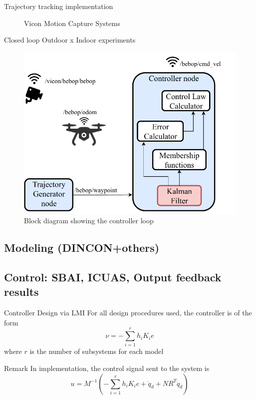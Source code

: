 \begin{frame}{Trajectory tracking implementation}
\begin{figure}
\begin{minipage}{0.45\textwidth}
        \caption{Vicon Motion Capture Systems}
    \end{minipage}
    \end{figure}
\end{frame}

\begin{frame}{Closed loop}
Outdoor x Indoor experiments
    \begin{figure}[!htb]
	\centering
	\includegraphics[scale=0.5]{figuras/control_scheme-Page-4.pdf}
	\caption{Block diagram showing the controller loop}
	\label{fig:control_scheme}
\end{figure}
\end{frame}



\subsection{Modeling (DINCON+others)}


\subsection{Control: SBAI, ICUAS, Output feedback results}
\begin{frame}{Controller Design via LMI}
	For all design procedures used, the controller is of the form
	\begin{equation}\label{FC}
	\nu=-\sum_{i=1}^{r}h_iK_ie
	\end{equation}
	where $r$ is the number of subsystems for each model
	
	\begin{block}{Remark}
	In implementation, the control signal sent to the system is 
	\begin{equation}
	    u = M^{-1} (-\sum_{i=1}^{r}h_iK_ie + \ddot{q}_d + NR^T\dot{q}_d) 
	\end{equation}
	\end{block}
\end{frame}


